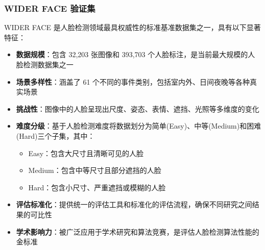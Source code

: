 \documentclass{article}
\begin{document}
\subsubsection{WIDER FACE 验证集}
WIDER FACE\cite{yang2016wider} 是人脸检测领域最具权威性的标准基准数据集之一，具有以下显著特征：
\begin{itemize}
    \item \textbf{数据规模}：包含 32,203 张图像和 393,703 个人脸标注，是当前最大规模的人脸检测数据集之一
    \item \textbf{场景多样性}：涵盖了 61 个不同的事件类别，包括室内外、日间夜晚等各种真实场景
    \item \textbf{挑战性}：图像中的人脸呈现出尺度、姿态、表情、遮挡、光照等多维度的变化
    \item \textbf{难度分级}：基于人脸检测难度将数据划分为简单(Easy)、中等(Medium)和困难(Hard)三个子集，其中：
    \begin{itemize}
        \item Easy：包含大尺寸且清晰可见的人脸
        \item Medium：包含中等尺寸且部分遮挡的人脸
        \item Hard：包含小尺寸、严重遮挡或模糊的人脸
    \end{itemize}
    \item \textbf{评估标准化}：提供统一的评估工具和标准化的评估流程，确保不同研究之间结果的可比性
    \item \textbf{学术影响力}：被广泛应用于学术研究和算法竞赛，是评估人脸检测算法性能的金标准
\end{itemize}
\end{document}
